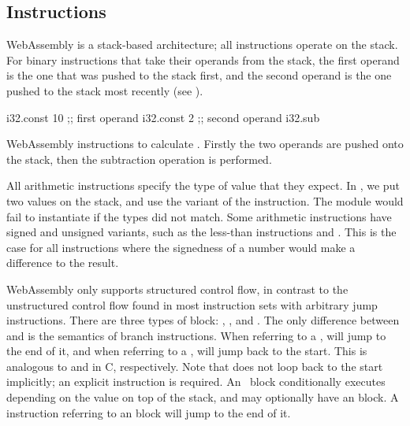\documentclass[00-main.tex]{subfiles}
\begin{document}
\subsection{Instructions}

WebAssembly is a stack-based architecture; all instructions operate on the stack.
For binary instructions that take their operands from the stack, the first operand is the one that was pushed to the stack first, and the second operand is the one pushed to the stack most recently (see ).

\begin{listing}[t]
  \begin{WasmListing}
    i32.const 10 ;; first operand
    i32.const 2  ;; second operand
    i32.sub
  \end{WasmListing}
  \caption{WebAssembly instructions to calculate . Firstly the two operands are pushed onto the stack, then the subtraction operation is performed.}
  \label{lst:wasm example sub instr}
\end{listing}

All arithmetic instructions specify the type of value that they expect. In , we put two  values on the stack, and use the  variant of the  instruction.
The module would fail to instantiate if the types did not match.
Some arithmetic instructions have signed and unsigned variants, such as the less-than instructions  and .
This is the case for all instructions where the signedness of a number would make a difference to the result.

WebAssembly only supports structured control flow, in contrast to the unstructured control flow found in most instruction sets with arbitrary jump instructions.
There are three types of block: , , and .
The only difference between  and  is the semantics of branch instructions.
When referring to a ,  will jump to the end of it, and when referring to a ,  will jump back to the start.
This is analogous to  and  in C, respectively.
Note that  does not loop back to the start implicitly; an explicit  instruction is required.
An ~block conditionally executes depending on the value on top of the stack, and may optionally have an  block.
A  instruction referring to an  block will jump to the end of it.
\end{document}
